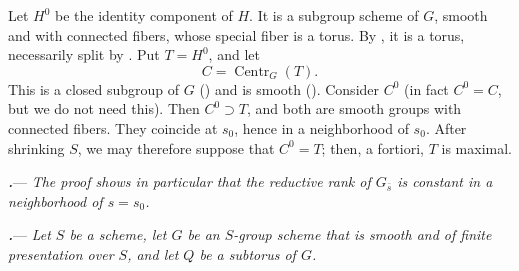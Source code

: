 Let \(H^0\) be the identity component of \(H\).  It is a subgroup
scheme of \(G\), smooth and with connected fibers, whose special
fiber is a torus.  By , it is a torus, necessarily split
by .  Put \(T=H^0\), and let
\[
  C=\operatorname{Centr}_G(T).
\]
This is a closed subgroup of \(G\) \textup{()}
and is smooth \textup{()}.  Consider \(C^0\)
\textup{(in fact \(C^0=C\), but we do not need this)}.  Then
\(C^0\supset T\), and both are smooth groups with connected fibers.
They coincide at \(s_0\), hence in a neighborhood of \(s_0\).
After shrinking \(S\), we may therefore suppose that \(C^0=T\);
then, a fortiori, \(T\) is maximal.

\par\medskip\noindent
{}\textbf{\textit{.}}---
\textit{The proof shows in particular that the reductive rank of
\(G_{\bar s}\) is constant in a neighborhood of \(s=s_0\).}

\par\medskip\noindent
{}\textbf{\textit{.}}---
\textit{Let \(S\) be a scheme, let \(G\) be an \(S\)-group scheme
that is smooth and of finite presentation over \(S\), and let \(Q\)
be a subtorus of \(G\).}
